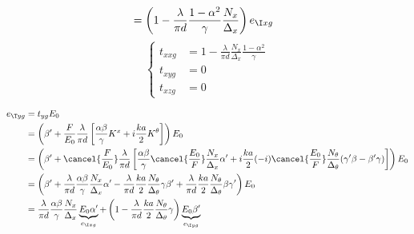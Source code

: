 \begin{refsection}
\begin{align*}
    &= \left(
           1
           -
           \frac{\lambda}{\pi d}
           \frac{1 - \alpha^2}{\gamma}
           \frac{N_x}{\Delta_x}
       \right)
       e_{\I xg}
\end{align*}
\begin{equation}
    \left\lbrace
    \begin{aligned}
        t_{xxg}
        &= 1
           -
           \frac{\lambda}{\pi d}
           \frac{N_x}{\Delta_x}
           \frac{1 - \alpha^2}{\gamma}
        \\
        t_{xyg} &= 0
        \\
        t_{xzg} &= 0
    \end{aligned}
    \right.
\end{equation}

\begin{align*}
    e_{\T yg} &= t_{yg} E_0
    \\
    &=
    \left(
        \beta'
        +
        \frac{F}{E_0}
        \frac{\lambda}{\pi d}
        \left[
            \frac{\alpha \beta}{\gamma}
            K^x
            +
            i
            \frac{ka}{2}
            K^\theta
        \right]
    \right)
    E_0
    \\
    &=
    \left(
        \beta'
        +
        \cancel{\frac{F}{E_0}}
        \frac{\lambda}{\pi d}
        \left[
            \frac{\alpha \beta}{\gamma}
            \cancel{\frac{E_0}{F}}
            \frac{N_x}{\Delta_x}
            \alpha'
            +
            i
            \frac{ka}{2}
            (-i)
            \cancel{\frac{E_0}{F}}
            \frac{N_\theta}{\Delta_\theta}
            (\gamma' \beta - \beta' \gamma)
        \right]
    \right)
    E_0
    \\
    &=
    \left(
        \beta'
        +
        \frac{\lambda}{\pi d}
        \frac{\alpha \beta}{\gamma}
        \frac{N_x}{\Delta_x}
        \alpha'
        -
        \frac{\lambda}{\pi d}
        \frac{ka}{2}
        \frac{N_\theta}{\Delta_\theta}
        \gamma
        \beta'
        +
        \frac{\lambda}{\pi d}
        \frac{ka}{2}
        \frac{N_\theta}{\Delta_\theta}
        \beta
        \gamma'
    \right)
    E_0
    \\
    &=
    \frac{\lambda}{\pi d}
    \frac{\alpha \beta}{\gamma}
    \frac{N_x}{\Delta_x}
    \underbrace{E_0 \alpha'}_{e_{\I xg}}
    +
    \left(
        1
        -
        \frac{\lambda}{\pi d}
        \frac{ka}{2}
        \frac{N_\theta}{\Delta_\theta}
        \gamma
    \right)
    \underbrace{E_0 \beta'}_{e_{\I yg}}

\end{align*}
\end{refsection}
